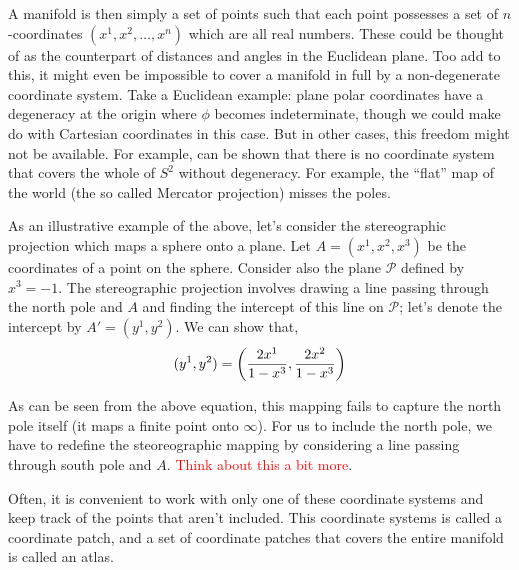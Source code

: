 \documentclass[a4paper,11pt]{article}
\begin{document}
A manifold is then simply a set of points such that each point possesses a set of $ n $-coordinates $ (x^1, x^2, \ldots, x^n) $ which are all real numbers. These could be thought of as the counterpart of distances and angles in the Euclidean plane. Too add to this, it might even be impossible to cover a manifold in full by a non-degenerate coordinate system. Take a Euclidean example: plane polar coordinates have a degeneracy at the origin where $ \phi $ becomes indeterminate, though we could make do with Cartesian coordinates in this case. But in other cases, this freedom might not be available. For example, can be shown that there is no coordinate system that covers the whole of $ S^2 $ without degeneracy. For example, the ``flat'' map of the world (the so called Mercator projection) misses the poles.

As an illustrative example of the above, let's consider the stereographic projection which maps a sphere onto a plane. Let $ A = (x^1, x^2, x^3) $ be the coordinates of a point on the sphere. Consider also the plane $ \mathcal{P} $ defined by $ x^3 = -1 $. The stereographic projection involves drawing a line passing through the north pole and $ A $ and finding the intercept of this line on $ \mathcal{P} $; let's denote the intercept by $ A' = (y^1, y^2) $. We can show that,
\begin{equation}\label{key}
(y^1, y^2) = \qty(\dfrac{2x^1}{1 - x^3}, \dfrac{2x^2}{1 - x^3})
\end{equation}

As can be seen from the above equation, this mapping fails to capture the north pole itself (it maps a finite point onto $ \infty $). For us to include the north pole, we have to redefine the steoreographic mapping by considering a line passing through south pole and $ A $. \textcolor{red}{Think about this a bit more}.

Often, it is convenient to work with only one of these coordinate systems and keep track of the points that aren't included. This coordinate systems is called  a coordinate patch, and a set of coordinate patches that covers the entire manifold is called an atlas.
\end{document}
